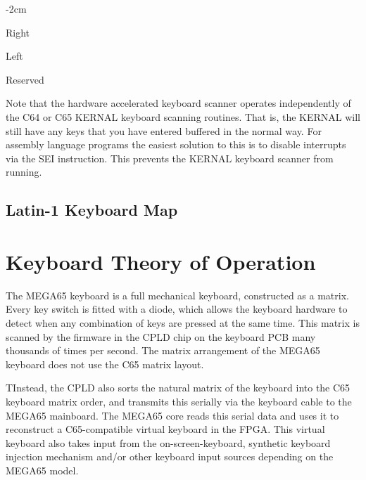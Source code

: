\begin{adjustwidth}{}{-2cm}
\begin{multicols}{2}
\begin{description}[align=left,labelwidth=0.2cm]
\item[Bit 0] Right 
\item[Bit 1] Left 
\item[Bit 2] 
\item[Bit 3] \megasymbolkey
\item[Bit 4] 
\item[Bit 5] 
\item[Bit 6] 
\item[Bit 7] Reserved
\end{description}
\end{multicols}
\end{adjustwidth}

Note that the hardware accelerated keyboard scanner operates independently of the
C64 or C65 KERNAL keyboard scanning routines.  That is, the KERNAL will still have
any keys that you have entered buffered in the normal way. For assembly language
programs the easiest solution to this is to disable interrupts via the SEI
instruction.  This prevents the KERNAL keyboard scanner from running.


\subsection{Latin-1 Keyboard Map}

\section{Keyboard Theory of Operation}

The MEGA65 keyboard is a full mechanical keyboard, constructed as a matrix. Every
key switch is fitted with a diode, which allows the keyboard hardware to detect
when any combination of keys are pressed at the same time.  This matrix is scanned
by the firmware in the CPLD chip on the keyboard PCB many thousands of times per
second.  The matrix arrangement of the MEGA65 keyboard does not use the C65
matrix layout.

TInstead, the CPLD also sorts the natural matrix of the keyboard
into the C65 keyboard matrix order, and transmits this serially via the keyboard
cable to the MEGA65 mainboard.  The MEGA65 core reads this serial data and uses it
to reconstruct a C65-compatible virtual keyboard in the FPGA.  This virtual keyboard
also takes input from the on-screen-keyboard, synthetic keyboard injection mechanism
and/or other keyboard input sources depending on the MEGA65 model.

